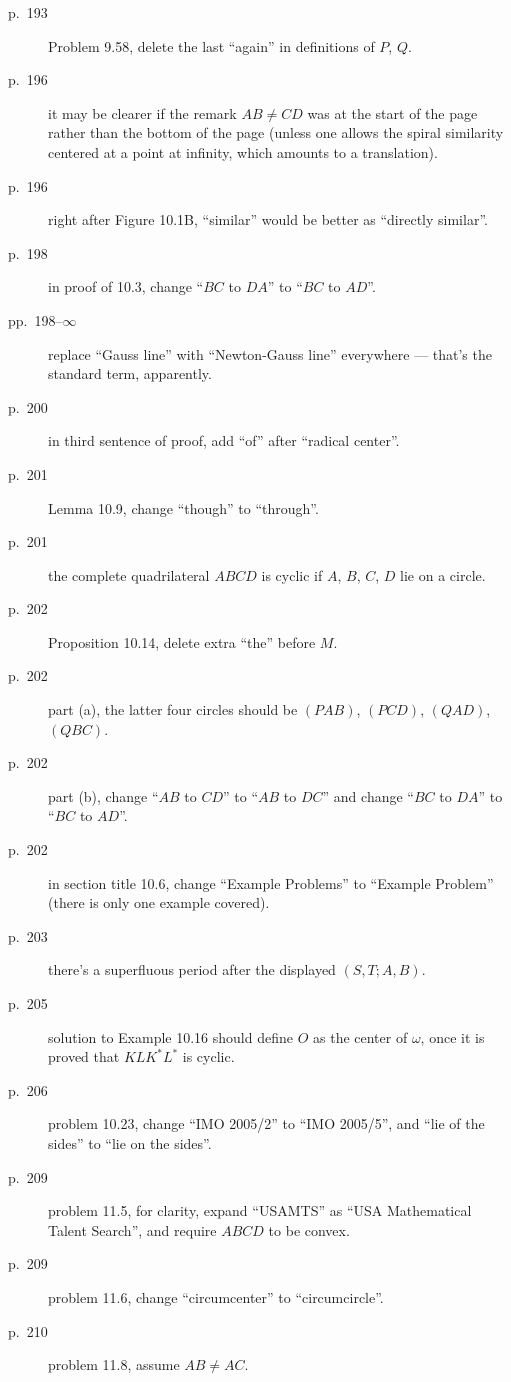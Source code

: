 \documentclass[11pt]{scrartcl}
\begin{document}
\begin{description}
\item[p.\  193] Problem 9.58, delete the last ``again'' in definitions of $P$, $Q$.
\item[p.\  196] it may be clearer if the remark $AB \neq CD$ was at the
  start of the page rather than the bottom of the page
  (unless one allows the spiral similarity centered at a point at infinity,
  which amounts to a translation).
\item[p.\  196] right after Figure 10.1B, ``similar'' would be better as ``directly similar''.
\item[p.\  198] in proof of 10.3, change ``$BC$ to $DA$'' to ``$BC$ to $AD$''.
\item[pp.\  198--$\infty$] replace ``Gauss line'' with ``Newton-Gauss line''
  everywhere --- that's the standard term, apparently.
\item[p.\  200] in third sentence of proof, add ``of'' after ``radical center''.
\item[p.\  201] Lemma 10.9, change ``though'' to ``through''.
\item[p.\  201] the complete quadrilateral $ABCD$ is cyclic if $A$, $B$, $C$, $D$ lie on a circle.
\item[p.\  202] Proposition 10.14, delete extra ``the'' before $M$.
\item[p.\  202] part (a), the latter four circles should be
  $(PAB)$, $(PCD)$, $(QAD)$, $(QBC)$.
\item[p.\  202] part (b), change ``$AB$ to $CD$'' to ``$AB$ to $DC$''
  and change ``$BC$ to $DA$'' to ``$BC$ to $AD$''.
\item[p.\  202] in section title 10.6, change ``Example Problems'' to ``Example Problem''
  (there is only one example covered).
\item[p.\  203] there's a superfluous period after the displayed $(S,T;A,B)$.
\item[p.\  205] solution to Example 10.16 should define $O$ as the center of $\omega$,
  once it is proved that $KL K^\ast L^\ast$ is cyclic.
\item[p.\  206] problem 10.23, change ``IMO 2005/2'' to ``IMO 2005/5'',
  and ``lie of the sides'' to ``lie on the sides''.
\item[p.\  209] problem 11.5, for clarity,
  expand ``USAMTS'' as ``USA Mathematical Talent Search'',
  and require $ABCD$ to be convex.
\item[p.\  209] problem 11.6, change ``circumcenter'' to ``circumcircle''.
\item[p.\  210] problem 11.8, assume $AB \neq AC$.

\end{description}
\end{document}
